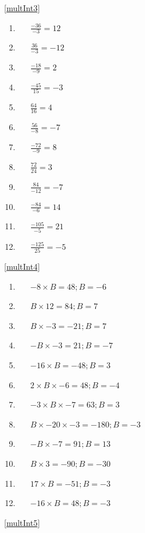 \documentclass[a4paper,12pt]{article}
\begin{document}
\ref{multInt3}
	\begin{multicols}{3}
	\begin{enumerate}[label=\footnotesize \roman*)]
		\item~~~$\displaystyle \frac{-36}{-3}=12$
		\item~~~$\displaystyle \frac{36}{-3}=-12$
		\item~~~$\displaystyle \frac{-18}{-9}=2$
		\item~~~$\displaystyle \frac{-45}{15}=-3$
		\item~~~$\displaystyle \frac{64}{16}=4$
		\item~~~$\displaystyle \frac{56}{-8}=-7$
		\item~~~$\displaystyle \frac{-72}{-9}=8$
		\item~~~$\displaystyle \frac{72}{24}=3$
		\item~~~$\displaystyle \frac{84}{-12}=-7$
		\item~~~$\displaystyle \frac{-84}{-6}=14$
		\item~~~$\displaystyle \frac{-105}{-5}=21$
		\item~~~$\displaystyle \frac{-125}{25}=-5$
	\end{enumerate}
\end{multicols}
\ref{multInt4}
	\begin{multicols}{3}
	\begin{enumerate}[label=\footnotesize \roman*)]
		\item~~~$-8\times B=48; B=-6$
		\item~~~$B\times12=84; B=7$
		\item~~~$B\times-3=-21; B=7$
		\item~~~$-B\times-3=21; B=-7$
		\item~~~$-16\times B=-48; B=3$
		\item~~~$2\times B \times-6=48; B=-4$
		\item~~~$-3\times B \times -7=63; B=3$
		\item~~~$B \times-20 \times -3=-180; B=-3$
		\item~~~$-B\times -7=91; B=13$
		\item~~~$B\times3=-90; B=-30$
		\item~~~$17\times B= -51; B=-3$
		\item~~~$-16\times B=48; B=-3$
	\end{enumerate}
\end{multicols}
\ref{multInt5}
\end{document}

